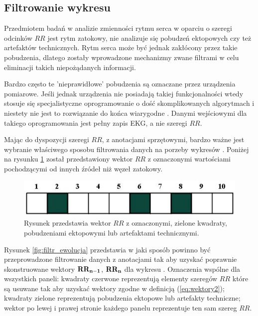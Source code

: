 \subsection{Filtrowanie wykresu \PP{}}

Przedmiotem badań w analizie zmienności rytmu serca w oparciu o szeregi odcinków $RR$ jest
rytm zatokowy, nie analizuje się pobudzeń ektopowych czy też artefaktów technicznych.
Rytm serca może być jednak zakłócony przez takie pobudzenia, dlatego zostały
wprowadzone mechanizmy zwane filtrami w celu eliminacji takich niepożądanych informacji. 

Bardzo często te 'nieprawidłowe' pobudzenia są oznaczane przez urządzenia pomiarowe.
Jeśli jednak urządzenia nie posiadają takiej funkcjonalności wtedy stosuje się
specjalistyczne oprogramowanie o dość skomplikowanych algorytmach i niestety nie jest to
rozwiązanie do końca wiarygodne \cite{task2}. Danymi wejściowymi dla takiego oprogramowania
jest pełny zapis EKG, a nie szeregi $RR$.

Mając do dyspozycji szeregi $RR$, z anotacjami sprzętowymi, bardzo ważne jest
wybranie właściwego sposobu filtrowania danych na porzeby wykresów \PP{}.
Poniżej na rysunku \ref{fig:filtr_start} został przedstawiony wektor $RR$ z oznaczonymi
wartościami pochodzącymi od innych źródeł niż węzeł zatokowy.
\begin{figure}
\centering
\includegraphics[scale=0.65]{graph/filtr_start.jpg}
\caption{Rysunek przedstawia wektor $RR$ z oznaczonymi, zielone kwadraty, pobudzeniami ektopowymi lub artefaktami technicznymi.}
\label{fig:filtr_start}
\end{figure}

Rysunek \ref{fig:filtr_ewolucja} przedstawia w jaki sposób powinno być przeprowadzone 
filtrowanie danych z anotacjami tak aby uzyskać poprawnie skonstruowane wektory $\mathbf{RR_{n-1}}$,
$\mathbf{RR_n}$ dla wykresu \PP{}. Oznaczenia wspólne dla wszystkich paneli: kwadraty czerwone
reprezentują elementy szeregów $RR$ które są usuwane tak aby uzyskać wektory zgodne w
definicją (\ref{eq:wektory2}); kwadraty zielone reprezentują pobudzenia ektopowe
lub artefakty techniczne; wektor po lewej i prawej stronie każdego panelu reprezentuje
ten sam szereg $RR$.

